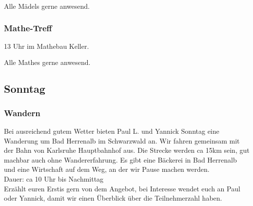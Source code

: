 \documentclass[10pt,ngerman]{scrartcl}
\begin{document}
\begin{multicols}{2}
Alle Mädels gerne anwesend.

\subsubsection{Mathe-Treff}

13 Uhr im Mathebau Keller.

Alle Mathes gerne anwesend.

\subsection{Sonntag}

\subsubsection{Wandern}

Bei ausreichend gutem Wetter bieten Paul L. und Yannick Sonntag eine Wanderung um Bad Herrenalb im Schwarzwald an.
Wir fahren gemeinsam mit der Bahn von Karlsruhe Hauptbahnhof aus.
Die Strecke werden ca 15km sein, gut machbar auch ohne Wandererfahrung.
Es gibt eine Bäckerei in Bad Herrenalb und eine Wirtschaft auf dem Weg, an der wir Pause machen werden. \\
Dauer: ca 10 Uhr bis Nachmittag \\
Erzählt euren Erstis gern von dem Angebot, bei Interesse wendet euch an Paul oder Yannick, damit wir einen Überblick über die Teilnehmerzahl haben.

\end{multicols}
\label{LastPage}
\end{document}
